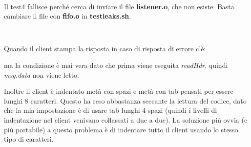 \documentclass[a4paper]{article}
\theoremstyle{theorem}
\theoremstyle{remark}
\theoremstyle{definition}
\theoremstyle{corollary}
\theoremstyle{lemma}
\newcommand\file[1]{%
	\textbf{#1}}
\newcommand\codeName[1]{%
	\textit{#1}}
\begin{document}
\

Il test4 fallisce perché cerca di inviare il file \file{listener.o}, che non esiste. Basta cambiare il file con \file{fifo.o} in \file{testleaks.sh}.
\

\

Quando il client stampa la risposta in caso di risposta di errore c'è:

ma la condizione è mai vera dato che prima viene eseguita \codeName{readHdr}, quindi \codeName{msg.data} non viene letto.

Inoltre il client è indentato metà con spazi e metà con tab pensati per essere lunghi 8 caratteri. Questo ha reso abbastanza seccante la lettura del codice, dato che la mia impostazione è di usare tab lunghi 4 spazi (quindi i livelli di indentazione nel client venivano collassati a due a due). La soluzione più ovvia (e più portabile) a questo problema è di indentare tutto il client usando lo stesso tipo di caratteri.
\end{document}
